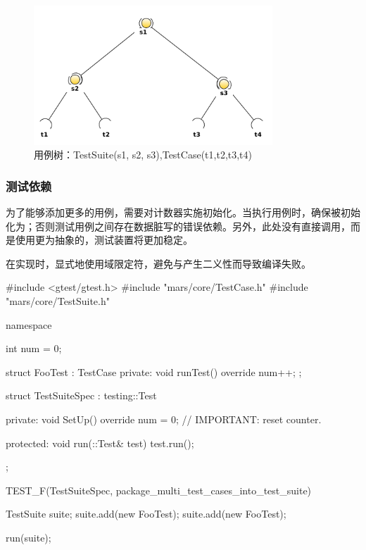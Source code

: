 \begin{content}
\begin{figure}[H]
\centering
\includegraphics[width=0.8\textwidth]{figures/xunit/test-tree-example.png}
\caption{用例树：TestSuite(s1, s2, s3),TestCase(t1,t2,t3,t4)}
 \label{fig:simple-test}
\end{figure}

\subsubsection{测试依赖}

为了能够添加更多的用例，需要对计数器实施初始化。当执行用例时，确保被初始化为；否则测试用例之间存在数据脏写的错误依赖。另外，此处没有直接调用，而是使用更为抽象的，测试装置将更加稳定。

在实现时，显式地使用域限定符，避免与产生二义性而导致编译失败。

\begin{leftbar}
 \begin{c++}[caption={\ttfamily{test/mars/core/TestSuiteSpec.cc}}]
#include <gtest/gtest.h>
#include "mars/core/TestCase.h"
#include "mars/core/TestSuite.h"

namespace {
  int num = 0;

  struct FooTest : TestCase {
  private:
    void runTest() override {
      num++;
    }
  };

  struct TestSuiteSpec : testing::Test {
  private:
    void SetUp() override {
      num = 0;  // IMPORTANT: reset counter.
    }

  protected:
    void run(::Test& test) {
      test.run();
    }
  };
}

TEST_F(TestSuiteSpec, package_multi_test_cases_into_test_suite) {
  TestSuite suite;
  suite.add(new FooTest);
  suite.add(new FooTest);

  run(suite);

}
\end{c++}
\end{leftbar}
\end{content}
